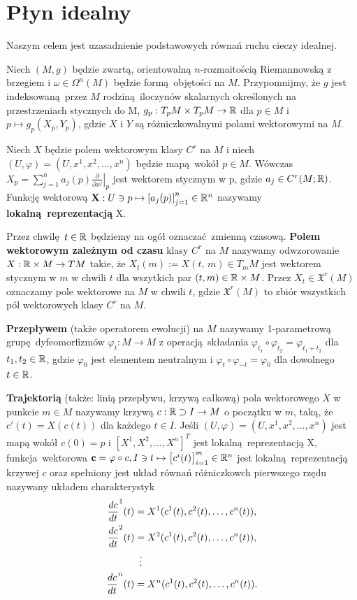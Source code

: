 \chapter{Płyn idealny} Naszym celem jest uzasadnienie podstawowych równań ruchu cieczy idealnej. 

Niech \((M, g)\) będzie zwartą, orientowalną \(n\)-rozmaitością Riemannowską z brzegiem i \(\omega \in \Omega^n(M)\) będzie formą objętości na \(M\). Przypomnijmy, że \(g\) jest indeksowaną przez \(M\) rodziną iloczynów skalarnych określonych na przestrzeniach stycznych do M, \(g_p: T_p M \times T_p M \rightarrow \mathbb{R}\) dla \(p\in M\) i \(p\mapsto g_p(X_p, Y_p)\), gdzie \(X\) i \(Y\) są różniczkowalnymi polami wektorowymi na \(M\).

Niech \(X\) będzie polem wektorowym klasy \(C^r\) na \(M\) i niech \((U, \varphi) = (U, x^1, x^2, \dots, x^n)\) będzie mapą wokół \(p\in M\). Wówczas \(X_p = \sum_{j=1}^{n}a_j(p)\left.\frac{\partial}{\partial x^j}\right|_p\) jest wektorem stycznym w p, gdzie \(a_j\in C^r(M; \mathbb{R})\). Funkcję wektorową \(\mathbf{X}: U\ni p \mapsto \left[a_j(p)\right]_{j=1}^n\in \mathbb{R}^n\) nazywamy \textbf{lokalną reprezentacją} X.

Przez chwilę \(t\in\mathbb{R}\) będziemy na ogół oznaczać zmienną czasową. \textbf{Polem wektorowym zależnym od czasu} klasy \(C^r\) na \(M\) nazywamy odwzorowanie \(X:\mathbb{R}\times M\rightarrow TM\) takie, że \(X_t(m):=X(t,\,m) \in T_{m} M\) jest wektorem stycznym w \(m\) w chwili \(t\) dla wszytkich par \((t, m) \in \mathbb{R} \times M\). Przez \(X_t\in \mathfrak{X}^r(M)\) oznaczamy pole wektorowe na \(M\) w chwili \(t\), gdzie \(\mathfrak{X}^r(M)\) to zbiór wszystkich pól wektorowych klasy \(C^r\) na \(M\). 

\textbf{Przepływem} (także operatorem ewolucji) na \(M\) nazywamy 1-parametrową grupę dyfeomorfizmów \(\varphi_t: M \rightarrow M\) z operacją składania \(\varphi_{t_1}\circ\varphi_{t_2} = \varphi_{t_1 + t_2}\) dla \(t_{1}, {t}_2 \in \mathbb{R}\), gdzie \(\varphi_0\) jest elementem neutralnym i \(\varphi_{t}\circ\varphi_{-t} = \varphi_0\) dla dowolnego \(t\in\mathbb{R}\).  

\textbf{Trajektorią} (także: linią przepływu, krzywą całkową) pola wektorowego \(X\) w punkcie \(m\in M\) nazywamy krzywą \(c: \mathbb{R} \supset I \rightarrow M\) o początku w \(m\), taką, że \(c'(t) = X(c(t))\) dla każdego \(t\in I\). Jeśli \((U, \varphi) = (U, x^1, x^2, \dots, x^n)\) jest mapą wokół \(c(0)=p\) i \([X^1, X^2, \dots, X^n]^T\) jest lokalną reprezentacją X, funkcja wektorowa \(\mathbf{c} = \varphi \circ c, I \ni t \mapsto \left[c^i(t)\right]_{i=1}^m \in \mathbb{R}^n\) jest lokalną reprezentacją krzywej \(c\) oraz spełniony jest układ równań różniczkowch pierwszego rzędu nazywany układem charakterystyk
\begin{align*}
    \frac{dc}{dt}^1(t) &= X^1(c^1(t), c^2(t), \dots, c^n(t)),\\
    \frac{dc}{dt}^2(t) &= X^2(c^1(t), c^2(t), \dots, c^n(t)),\\
    &\mathrel{\makebox[\widthof{=}]{\vdots}}  \\
    \frac{dc}{dt}^n(t) &= X^n(c^1(t), c^2(t), \dots, c^n(t)).
\end{align*}

